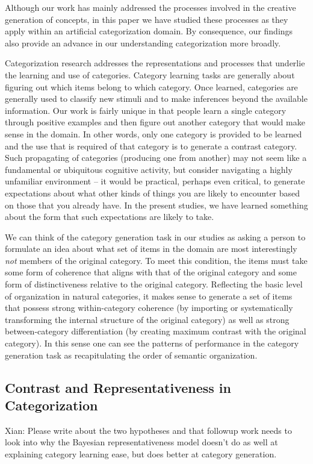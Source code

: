 \documentclass[12pt]{article}
\begin{document}
\begin{flushleft}
Although our work has mainly addressed the processes involved in the creative generation of  concepts, in this paper we have studied these processes as they apply within an artificial categorization domain. By consequence, our findings also provide an advance in our understanding categorization more broadly.

Categorization research addresses the representations and processes that underlie the learning and use of categories. Category learning tasks are generally about figuring out which items belong to which category. Once learned, categories are generally used to classify new stimuli and to make inferences beyond the available information. Our work is fairly unique in that people learn a single category through positive examples and then figure out another category that would make sense in the domain. In other words, only one category is provided to be learned and the use that is required of that category is to generate a contrast category. Such propagating of categories (producing one from another) may not seem like a fundamental or ubiquitous cognitive activity, but consider navigating a highly unfamiliar environment -- it would be practical, perhaps even critical, to generate expectations about what other kinds of things you are likely to encounter based on those that you already have. In the present studies, we have learned something about the form that such expectations are likely to take. 

We can think of the category generation task in our studies as asking a person to formulate an idea about what set of items in the domain are most interestingly {\em not} members of the original category. To meet this condition, the items must take some form of coherence that aligns with that of the original category and some form of distinctiveness relative to the original category. Reflecting the basic level of organization in natural categories, it makes sense to generate a set of items that possess strong within-category coherence (by importing or systematically transforming the internal structure of the original category) as well as strong between-category differentiation (by creating maximum contrast with the original category). In this sense one can see the patterns of performance in the category generation task as recapitulating the order of semantic organization.

\subsection{Contrast and Representativeness in Categorization}
Xian: Please write about the two hypotheses and that followup work needs to look into why the Bayesian representativeness model doesn't do as well at explaining category learning ease, but does better at category generation. 


\end{flushleft}
\end{document}
